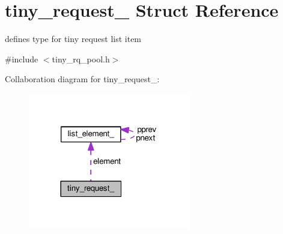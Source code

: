 \hypertarget{structtiny__request__}{}\section{tiny\+\_\+request\+\_\+ Struct Reference}
\label{structtiny__request__}


defines type for tiny request list item  




{\ttfamily \#include $<$tiny\+\_\+rq\+\_\+pool.\+h$>$}



Collaboration diagram for tiny\+\_\+request\+\_\+\+:\nopagebreak
\begin{figure}[H]
\begin{center}
\leavevmode
\includegraphics[width=201pt]{structtiny__request____coll__graph}
\end{center}
\end{figure}
